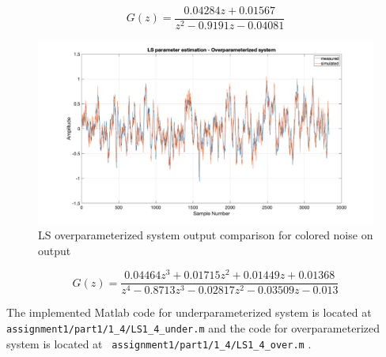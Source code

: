 \begin{equation}
	G(z) =	\frac{0.04284 z + 0.01567}{z^2 - 0.9191 z - 0.04081}
	\label{eq:LSIUOPUnderP}
\end{equation}

\begin{figure}
	\centering
	\includegraphics[totalheight=8cm]{images/LSIUOPOverPOutputVSSimulated.png}
	\caption{LS overparameterized system output comparison for colored noise on output}
	\label{fig:LSIUOPOverPOutputVSSimulated}
\end{figure}

\begin{equation}
	G(z) =	\frac{0.04464 z^3 + 0.01715 z^2 + 0.01449 z + 0.01368}{z^4 - 0.8713 z^3 - 0.02817 z^2 - 0.03509 z - 0.013}
	\label{eq:LSIUOPOverP}
\end{equation}

The implemented Matlab code for underparameterized system is located at  \hspace{-1ex}\lstinline| assignment1/part1/1_4/LS1_4_under.m| and the code for overparameterized system is located at  \hspace{-1ex}\lstinline| assignment1/part1/1_4/LS1_4_over.m| . 
